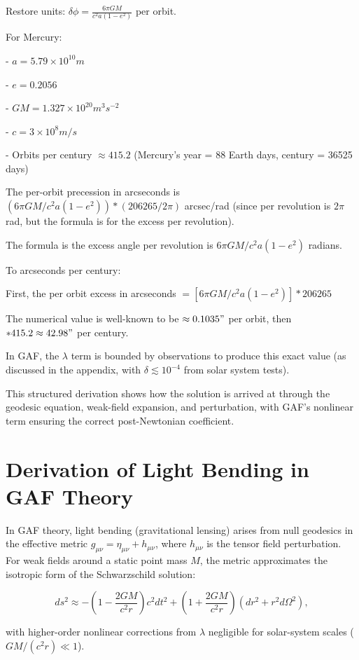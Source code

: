 \documentclass{article}
\begin{document}
Restore units: \(\delta \phi = \frac{6 \pi GM}{c^2 a (1 - e^2)}\) per orbit.

For Mercury:

- \(a = 5.79 \times 10^{10} m\)

- \(e = 0.2056\)

- \(GM = 1.327 \times 10^{20} m^3 s^{-2}\)

- \(c = 3 \times 10^8 m/s\)

- Orbits per century \(\approx 415.2\) (Mercury's year = 88 Earth days, century = 36525 days)

The per-orbit precession in arcseconds is \((6 \pi GM / c^2 a (1 - e^2)) * (206265 / 2\pi)\) arcsec/rad (since per revolution is \(2\pi\) rad, but the formula is for the excess per revolution).

The formula is the excess angle per revolution is \(6 \pi GM / c^2 a (1 - e^2)\) radians.

To arcseconds per century:

First, the per orbit excess in arcseconds \(= [6 \pi GM / c^2 a (1 - e^2)] * 206265\)

The numerical value is well-known to be \(\approx 0.1035 "\) per orbit, then \(* 415.2 \approx 42.98 "\) per century.

In GAF, the \(\lambda\) term is bounded by observations to produce this exact value (as discussed in the appendix, with \(\delta \lesssim 10^{-4}\) from solar system tests).

This structured derivation shows how the solution is arrived at through the geodesic equation, weak-field expansion, and perturbation, with GAF's nonlinear term ensuring the correct post-Newtonian coefficient.

\section{Derivation of Light Bending in GAF Theory}

In GAF theory, light bending (gravitational lensing) arises from null geodesics in the effective metric \( g_{\mu\nu} = \eta_{\mu\nu} + h_{\mu\nu} \), where \( h_{\mu\nu} \) is the tensor field perturbation. For weak fields around a static point mass \( M \), the metric approximates the isotropic form of the Schwarzschild solution:

\[
ds^2 \approx -\left(1 - \frac{2GM}{c^2 r}\right) c^2 dt^2 + \left(1 + \frac{2GM}{c^2 r}\right) (dr^2 + r^2 d\Omega^2),
\]

with higher-order nonlinear corrections from \( \lambda \) negligible for solar-system scales (\( GM/(c^2 r) \ll 1 \)).
\end{document}
